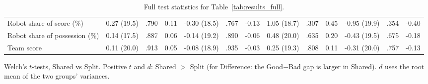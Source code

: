 \begin{table}[H]
\begin{tabular}{l|ccc|ccc|ccc|ccc}
Robot share of score (\%) & 0.27 (19.5) & .790 & 0.11 & -0.30 (18.5) & .767 & -0.13 & 1.05 (18.7) & .307 & 0.45 & -0.95 (19.9) & .354 & -0.40 \\
Robot share of possession (\%) & 0.14 (17.5) & .887 & 0.06 & -0.14 (19.2) & .890 & -0.06 & 0.48 (20.0) & .635 & 0.20 & -0.43 (19.5) & .675 & -0.18 \\
Team score & 0.11 (20.0) & .913 & 0.05 & -0.08 (18.9) & .935 & -0.03 & 0.25 (19.3) & .808 & 0.11 & -0.31 (20.0) & .757 & -0.13 \\
\bottomrule
\end{tabular}
\par\smallskip\raggedright\scriptsize Welch's $t$-tests, Shared vs Split. Positive $t$ and $d$: Shared $>$ Split (for Difference: the Good$-$Bad gap is larger in Shared). $d$ uses the root mean of the two groups' variances.
\caption{Full test statistics for Table~\ref{tab:results_full}.}
\label{tab:stats_full}
\end{table}

